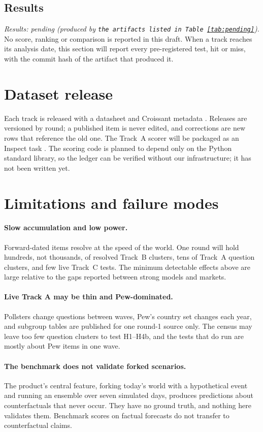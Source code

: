 \documentclass[11pt]{article}
\newcommand{\pending}[1]{\textit{Results: pending (produced by \texttt{#1}).}}
\begin{document}
\subsection{Results}
\pending{the artifacts listed in Table~\ref{tab:pending}}
No score, ranking or comparison is reported in this draft. When a track reaches its analysis date, this section will report every pre-registered test, hit or miss, with the commit hash of the artifact that produced it.

\section{Dataset release}

Each track is released with a datasheet \citep{gebru2021datasheets} and Croissant metadata \citep{akhtar2024croissant}. Releases are versioned by round; a published item is never edited, and corrections are new rows that reference the old one. The Track~A scorer will be packaged as an Inspect task \citep{inspect2026}. The scoring code is planned to depend only on the Python standard library, so the ledger can be verified without our infrastructure; it has not been written yet.

\section{Limitations and failure modes}
\label{sec:limits}

\paragraph{Slow accumulation and low power.} Forward-dated items resolve at the speed of the world. One round will hold hundreds, not thousands, of resolved Track~B clusters, tens of Track~A question clusters, and few live Track~C tests. The minimum detectable effects above are large relative to the gaps reported between strong models and markets.

\paragraph{Live Track A may be thin and Pew-dominated.} Pollsters change questions between waves, Pew's country set changes each year, and subgroup tables are published for one round-1 source only. The census may leave too few question clusters to test H1--H4b, and the tests that do run are mostly about Pew items in one wave.

\paragraph{The benchmark does not validate forked scenarios.} The product's central feature, forking today's world with a hypothetical event and running an ensemble over seven simulated days, produces predictions about counterfactuals that never occur. They have no ground truth, and nothing here validates them. Benchmark scores on factual forecasts do not transfer to counterfactual claims.
\end{document}
